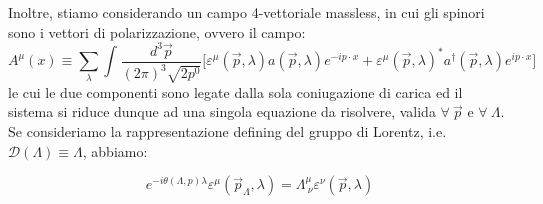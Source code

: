 \documentclass[../main.tex]{subfiles}
\begin{document}
Inoltre, stiamo considerando un campo 4-vettoriale massless, in cui gli spinori sono i vettori di polarizzazione, ovvero il campo:
\begin{equation}
    A^\mu(x) \equiv \sum_\lambda \int_{}\frac{d^3\Vec p}{(2\pi)^3\sqrt{2p^0}}\big[\varepsilon^\mu(\Vec{p},\lambda)a(\Vec{p},\lambda)e^{-ip\cdot x}+\varepsilon^\mu(\Vec{p},\lambda)^\ast a^\dagger(\Vec{p},\lambda)e^{ip\cdot x}\big]
    \label{eq:photon_field}
\end{equation}
le cui le due componenti sono legate dalla sola coniugazione di carica ed il sistema si riduce dunque ad una singola equazione da risolvere, valida $\forall~\Vec{p}$ e $\forall~\Lambda$. Se consideriamo la rappresentazione defining del gruppo di Lorentz, i.e. $\mathscr D(\Lambda) \equiv \Lambda$, abbiamo:

\begin{equation}
    \boxed{e^{-i\theta(\Lambda, p)\lambda}\varepsilon^\mu(\Vec{p}_\Lambda,\lambda) = \Lambda^\mu_{~\nu} \varepsilon^\nu(\Vec{p},\lambda)}
    \label{eq:poinc_lorentz_conn_massless_merged}
\end{equation}
\end{document}
